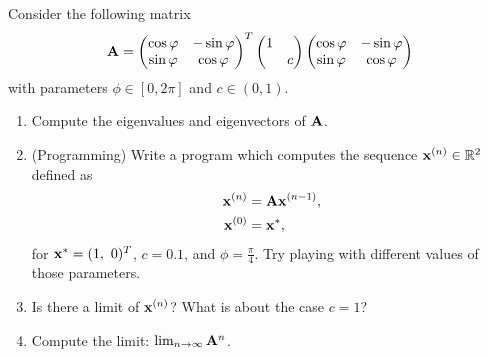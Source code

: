 \begin{Sheet}
  \begin{Problem}
    Consider the following matrix
    \begin{gather*}
      \mathbf A =
      \begin{pmatrix}
        \cos\varphi & -\sin\varphi\\
        \sin\varphi &  \cos\varphi
      \end{pmatrix}^T
      \begin{pmatrix}
        1 & \\
          & c
      \end{pmatrix}
      \begin{pmatrix}
        \cos\varphi & -\sin\varphi\\
        \sin\varphi &  \cos\varphi
      \end{pmatrix}
    \end{gather*}
    with parameters $\phi\in[0,2\pi]$ and $c\in(0,1)$.
    \begin{enumerate}
    \item Compute the eigenvalues and eigenvectors of $\mathbf A$.
    \item (Programming) Write a program which computes the sequence
      $\mathbf x^{(n)}\in\mathbb R^2$ defined as
      \begin{align*}
        \mathbf x^{(n)} &= \mathbf A \mathbf x^{(n-1)}, \\
        \mathbf x^{(0)} &= \mathbf x^{*},
      \end{align*}
      for $\vx^{*} = (1,\ 0)^T$, $c = 0.1$, and
      $\phi=\frac\pi4$. Try playing with different values of those
      parameters.
    \item Is there a limit of $\mathbf x^{(n)}$? What is about the case
      $c=1$?
    \item Compute the limit: $\lim_{n\to\infty}\mathbf A^n$.
    \end{enumerate}
  \end{Problem}
\end{Sheet}

